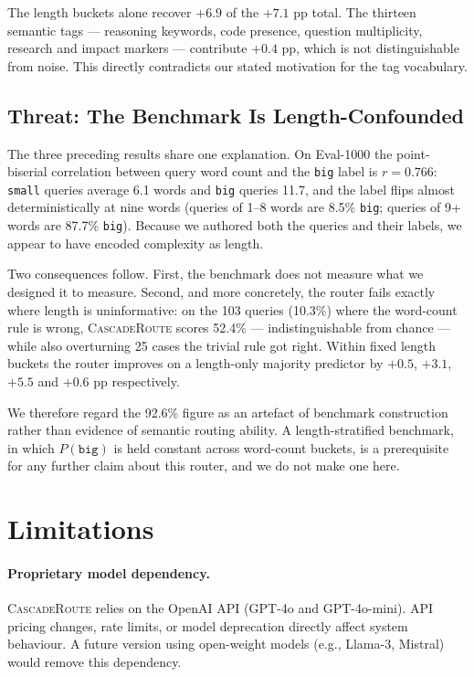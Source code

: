 \documentclass{article}
\newcommand{\system}{\textsc{CascadeRoute}}
\newcommand{\smallmdl}{GPT-4o-mini}
\newcommand{\largemdl}{GPT-4o}
\begin{document}
The length buckets alone recover $+6.9$ of the $+7.1$ pp total. The thirteen
semantic tags --- reasoning keywords, code presence, question multiplicity,
research and impact markers --- contribute $+0.4$ pp, which is not
distinguishable from noise. This directly contradicts our stated motivation
for the tag vocabulary.

\subsection{Threat: The Benchmark Is Length-Confounded}
\label{sec:confound}

The three preceding results share one explanation. On Eval-1000 the
point-biserial correlation between query word count and the \texttt{big} label
is $r = 0.766$: \texttt{small} queries average 6.1 words and \texttt{big}
queries 11.7, and the label flips almost deterministically at nine words
(queries of 1--8 words are 8.5\% \texttt{big}; queries of 9+ words are 87.7\%
\texttt{big}). Because we authored both the queries and their labels, we
appear to have encoded complexity as length.

Two consequences follow. First, the benchmark does not measure what we
designed it to measure. Second, and more concretely, the router fails exactly
where length is uninformative: on the 103 queries (10.3\%) where the word-count
rule is wrong, \system{} scores 52.4\% --- indistinguishable from chance --- while
also overturning 25 cases the trivial rule got right. Within fixed length
buckets the router improves on a length-only majority predictor by
$+0.5$, $+3.1$, $+5.5$ and $+0.6$ pp respectively.

We therefore regard the 92.6\% figure as an artefact of benchmark construction
rather than evidence of semantic routing ability. A length-stratified benchmark,
in which $P(\texttt{big})$ is held constant across word-count buckets, is a
prerequisite for any further claim about this router, and we do not make one here.

\section{Limitations}
\label{sec:limitations}

\paragraph{Proprietary model dependency.}
\system{} relies on the OpenAI API (\largemdl{} and \smallmdl{}). API
pricing changes, rate limits, or model deprecation directly affect system
behaviour. A future version using open-weight models (e.g., Llama-3,
Mistral) would remove this dependency.
\end{document}
